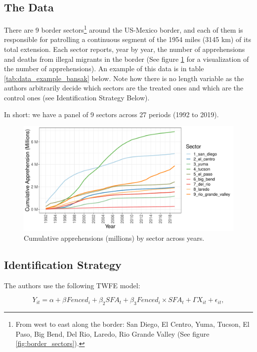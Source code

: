 \documentclass[titlepage]{article}
\begin{document}
\subsection*{The Data}

There are 9 border sectors\footnote{From west to east along the border: San Diego, El Centro, Yuma, Tucson, El Paso, Big Bend, Del Rio, Laredo, Rio Grande Valley (See figure \ref{fig:border_sectors}). } around the US-Mexico border, and each of them is responsible for patrolling a continuous segment of the 1954 miles (3145 km) of its total extension. Each sector reports, year by year, the number of apprehensions and deaths from illegal migrants in the border (See figure \ref{fig:plot_cum_app} for a visualization of the number of apprehensions). An example of this data is in table \ref{tab:data_example_bansak} below. Note how there is no length variable as the authors arbitrarily decide which sectors are the treated ones and which are the control ones (see Identification Strategy Below).

In short: we have a panel of 9 sectors across 27 periods (1992 to 2019).



\begin{figure}[H]
\centering
    \caption{Cumulative apprehensions (millions) by sector across years.} 
    \label{fig:plot_cum_app} 
    \includegraphics[width=\textwidth]{_images/plot_cum_app.pdf}
\end{figure}

\subsection*{Identification Strategy}

The authors use the following TWFE model:

\begin{equation}
    Y_{it} = \alpha + \beta_{}\textit{Fenced}_{i} + \beta_{2}\textit{SFA}_{t} + \beta_{3}\textit{Fenced}_{i} \times \textit{SFA}_{t} + \Gamma X_{it} + \epsilon_{it},
\end{equation}
\end{document}
